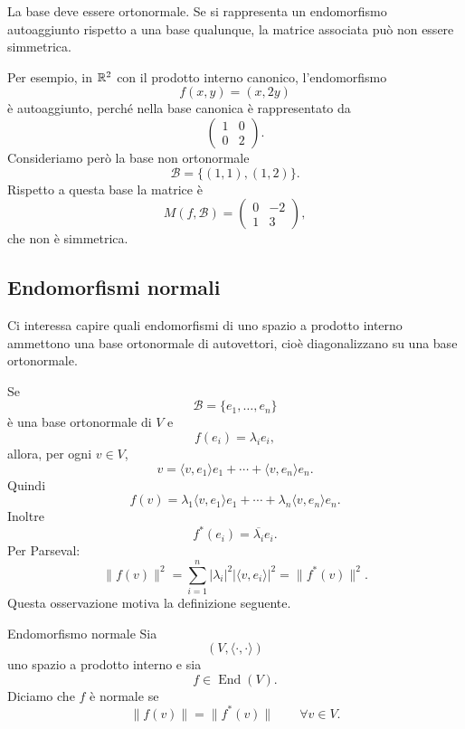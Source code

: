 \documentclass[a4paper]{article}
\begin{document}
\begin{snippetremark}{}
    La base deve essere ortonormale. Se si rappresenta un endomorfismo autoaggiunto rispetto a una base qualunque, la matrice associata può non essere simmetrica.

    Per esempio, in \(\mathbb{R}^2\) con il prodotto interno canonico, l'endomorfismo
    \[
        f(x,y)=(x,2y)
    \]
    è autoaggiunto, perché nella base canonica è rappresentato da
    \[
        \begin{pmatrix}
            1 & 0\\
            0 & 2
        \end{pmatrix}.
    \]
    Consideriamo però la base non ortonormale
    \[
        \mathcal{B}=\{(1,1),(1,2)\}.
    \]
    Rispetto a questa base la matrice è
    \[
        M(f,\mathcal{B})
        =
        \begin{pmatrix}
            0 & -2\\
            1 & 3
        \end{pmatrix},
    \]
    che non è simmetrica.
\end{snippetremark}

\subsection{Endomorfismi normali}

Ci interessa capire quali endomorfismi di uno spazio a prodotto interno ammettono una base ortonormale di autovettori, cioè diagonalizzano su una base ortonormale.

Se
\[
    \mathcal{B}=\{e_1,\ldots,e_n\}
\]
è una base ortonormale di \(V\) e
\[
    f(e_i)=\lambda_i e_i,
\]
allora, per ogni \(v\in V\),
\[
    v=\langle v,e_1\rangle e_1+\cdots+\langle v,e_n\rangle e_n.
\]
Quindi
\[
    f(v)=
    \lambda_1\langle v,e_1\rangle e_1
    +\cdots+
    \lambda_n\langle v,e_n\rangle e_n.
\]
Inoltre
\[
    f^*(e_i)=\overline{\lambda_i}e_i.
\]
Per Parseval:
\[
    \|f(v)\|^2
    =
    \sum_{i=1}^{n}|\lambda_i|^2|\langle v,e_i\rangle|^2
    =
    \|f^*(v)\|^2.
\]
Questa osservazione motiva la definizione seguente.

\begin{snippetdefinition}{Endomorfismo normale}
    Sia
    \[
        (V,\langle\cdot,\cdot\rangle)
    \]
    uno spazio a prodotto interno e sia
    \[
        f\in\operatorname{End}(V).
    \]
    Diciamo che \(f\) è normale se
    \[
        \|f(v)\|=\|f^*(v)\|
        \qquad
        \forall v\in V.
    \]
\end{snippetdefinition}
\end{document}
